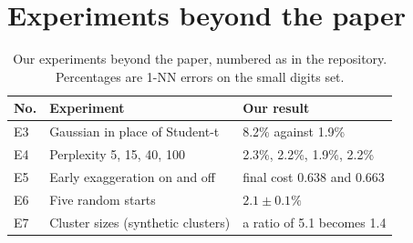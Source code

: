 \documentclass{article}
\newcommand{\appendixnumbering}[1]{%
  \setcounter{figure}{0}\setcounter{table}{0}%
  \renewcommand{\thefigure}{#1\arabic{figure}}\renewcommand{\theHfigure}{#1\arabic{figure}}%
  \renewcommand{\thetable}{#1\arabic{table}}\renewcommand{\theHtable}{#1\arabic{table}}}
\begin{document}
\clearpage
\section{Experiments beyond the paper}
\label{app:beyond}
\appendixnumbering{G}

\begin{table}[H]
  \caption{Our experiments beyond the paper, numbered as in the repository. Percentages are 1-NN errors on the small digits set.}
  \label{tab:experiments}
  \centering
  \small
  \begin{tabular}{lll}
    \toprule
    No. & Experiment & Our result \\
    \midrule
    E3 & Gaussian in place of Student-t & 8.2\% against 1.9\% \\
    E4 & Perplexity 5, 15, 40, 100 & 2.3\%, 2.2\%, 1.9\%, 2.2\% \\
    E5 & Early exaggeration on and off & final cost 0.638 and 0.663 \\
    E6 & Five random starts & $2.1 \pm 0.1\%$ \\
    E7 & Cluster sizes (synthetic clusters) & a ratio of 5.1 becomes 1.4 \\
    \bottomrule
  \end{tabular}
\end{table}
\end{document}
